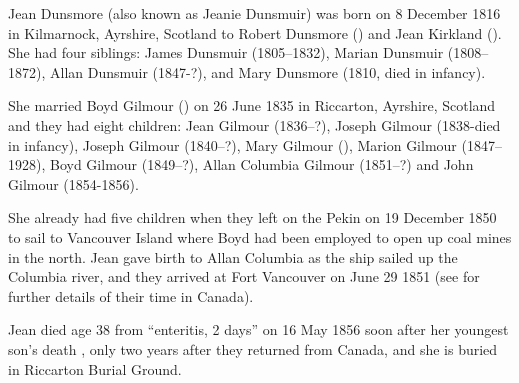 
Jean Dunsmore (also known as Jeanie Dunsmuir) was born on 8 December 1816 in Kilmarnock, Ayrshire, Scotland to Robert Dunsmore () and Jean Kirkland ().  She had four siblings:  James Dunsmuir (1805--1832), Marian Dunsmuir (1808--1872), Allan Dunsmuir (1847-?),  and Mary Dunsmore (1810, died in infancy).

She married Boyd Gilmour () on 26 June 1835  in Riccarton, Ayrshire, Scotland \cite{JeanDunsmoreMarraige} and they had eight children:  Jean Gilmour (1836--?), Joseph Gilmour (1838-died in infancy), Joseph Gilmour (1840--?), Mary Gilmour (), Marion Gilmour (1847--1928), Boyd Gilmour (1849--?), Allan Columbia Gilmour (1851--?) and John Gilmour (1854-1856).

She already had five children when they left on the Pekin on 19 December 1850 to sail to Vancouver Island where Boyd had been employed to open up coal mines in the north. Jean gave birth to Allan Columbia as the ship sailed up the Columbia river, and they arrived at Fort Vancouver on June 29 1851 (see  for further details of their time in Canada).  

Jean died age 38 from ``enteritis, 2 days'' on 16 May 1856 soon after her youngest son's death \cite{JeanDunsmoreDeath}, only two years after they returned from Canada, and she is buried in Riccarton Burial Ground.
